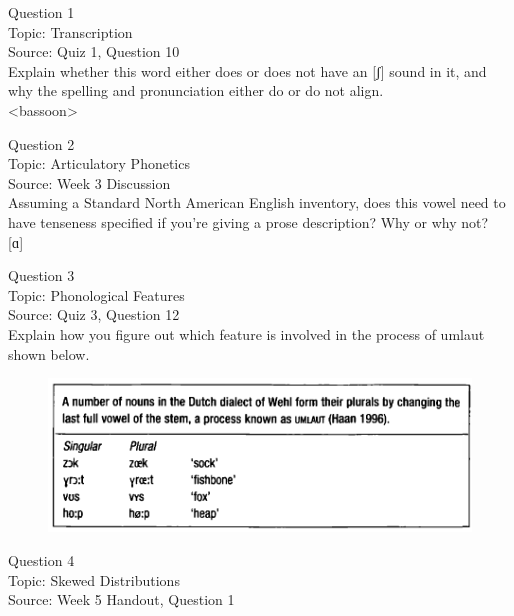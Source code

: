 \documentclass[12pt]{article}
\begin{document}
{\large Question 1}\\

Topic: Transcription\\
Source: Quiz 1, Question 10\\

Explain whether this word either does or does not have an [ʃ] sound in it, and why the spelling and pronunciation either do or do not align.\\

<bassoon>


\newpage

{\large Question 2}\\

Topic: Articulatory Phonetics\\
Source: Week 3 Discussion\\

Assuming a Standard North American English inventory, does this vowel need to have tenseness specified if you're giving a prose description? Why or why not?\\

{[ɑ]}


\newpage

{\large Question 3}\\

Topic: Phonological Features\\
Source: Quiz 3, Question 12\\

Explain how you figure out which feature is involved in the process of umlaut shown below.\\

\begin{figure}[H]
\includegraphics{../images/dutch.png}
\end{figure}

\newpage

{\large Question 4}\\

Topic: Skewed Distributions\\
Source: Week 5 Handout, Question 1\\
\end{document}
